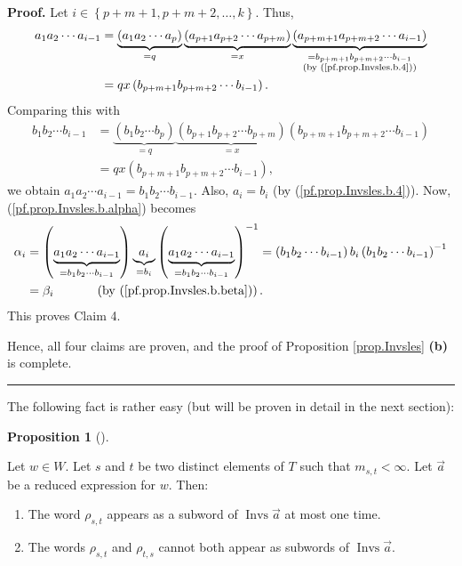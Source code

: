 \documentclass
[numbers=enddot,12pt,final,onecolumn,notitlepage,abstracton]{scrartcl}%
\theoremstyle{definition}
\newtheorem{prop}[theo]{Proposition}
\newenvironment{proposition}[1][]
{\begin{prop}[#1]\begin{leftbar}}
{\end{leftbar}\end{prop}}
\newenvironment{proof}[1][Proof]{\noindent\textbf{#1.} }{\ \rule{0.5em}{0.5em}}
\begin{document}
\begin{proof}
Let $i\in\left\{  p+m+1,p+m+2,\ldots,k\right\}  $. Thus,%
\begin{align*}
a_{1}a_{2}\cdots a_{i-1}  &  =\underbrace{\left(  a_{1}a_{2}\cdots
a_{p}\right)  }_{=q}\underbrace{\left(  a_{p+1}a_{p+2}\cdots a_{p+m}\right)
}_{=x}\underbrace{\left(  a_{p+m+1}a_{p+m+2}\cdots a_{i-1}\right)
}_{\substack{=b_{p+m+1}b_{p+m+2}\cdots b_{i-1}\\\text{(by
(\ref{pf.prop.Invsles.b.4}))}}}\\
&  =qx\left(  b_{p+m+1}b_{p+m+2}\cdots b_{i-1}\right)  .
\end{align*}
Comparing this with
\begin{align*}
b_{1}b_{2}\cdots b_{i-1}  &  =\underbrace{\left(  b_{1}b_{2}\cdots
b_{p}\right)  }_{=q}\underbrace{\left(  b_{p+1}b_{p+2}\cdots b_{p+m}\right)
}_{=x}\left(  b_{p+m+1}b_{p+m+2}\cdots b_{i-1}\right) \\
&  =qx\left(  b_{p+m+1}b_{p+m+2}\cdots b_{i-1}\right)  ,
\end{align*}
we obtain $a_{1}a_{2}\cdots a_{i-1}=b_{1}b_{2}\cdots b_{i-1}$. Also,
$a_{i}=b_{i}$ (by (\ref{pf.prop.Invsles.b.4})). Now,
(\ref{pf.prop.Invsles.b.alpha}) becomes%
\begin{align*}
\alpha_{i}  &  =\left(  \underbrace{a_{1}a_{2}\cdots a_{i-1}}_{=b_{1}%
b_{2}\cdots b_{i-1}}\right)  \underbrace{a_{i}}_{=b_{i}}\left(
\underbrace{a_{1}a_{2}\cdots a_{i-1}}_{=b_{1}b_{2}\cdots b_{i-1}}\right)
^{-1}=\left(  b_{1}b_{2}\cdots b_{i-1}\right)  b_{i}\left(  b_{1}b_{2}\cdots
b_{i-1}\right)  ^{-1}\\
&  =\beta_{i}\ \ \ \ \ \ \ \ \ \ \left(  \text{by
(\ref{pf.prop.Invsles.b.beta})}\right)  .
\end{align*}
This proves Claim 4.

Hence, all four claims are proven, and the proof of Proposition
\ref{prop.Invsles} \textbf{(b)} is complete.
\end{proof}

The following fact is rather easy (but will be proven in detail in the next section):

\begin{proposition}
\label{prop.has}Let $w\in W$. Let $s$ and $t$ be two distinct elements of $T$
such that $m_{s,t}<\infty$. Let $\overrightarrow{a}$ be a reduced expression
for $w$. Then:

\begin{enumerate}
\item[\textbf{(a)}] The word $\rho_{s,t}$ appears as a subword of
$\operatorname*{Invs}\overrightarrow{a}$ at most one time.

\item[\textbf{(b)}] The words $\rho_{s,t}$ and $\rho_{t,s}$ cannot both appear
as subwords of $\operatorname*{Invs}\overrightarrow{a}$.
\end{enumerate}
\end{proposition}
\end{document}
